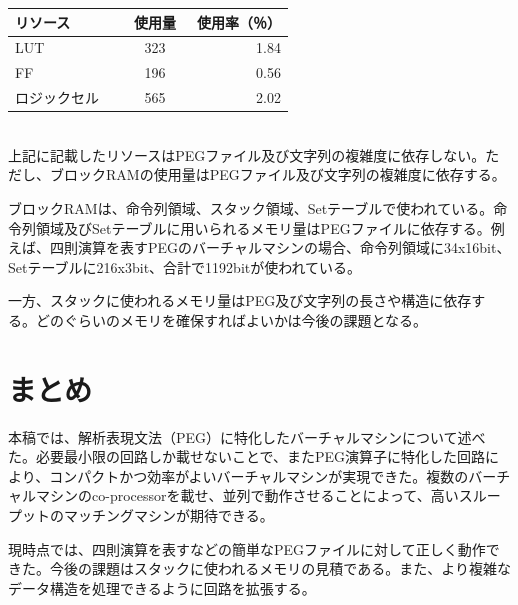 \documentclass[paper]{ieicej}
\begin{document}
\begin{tabular}[t]{lcr}
	\hline\hline
	 リソース　& 使用量　& 使用率（％） \\\hline
	 LUT & 323 & 1.84 \\
	 FF & 196 & 0.56 \\
	 ロジックセル　& 565 & 2.02 \\\hline
\end{tabular}\\
	 


上記に記載したリソースはPEGファイル及び文字列の複雑度に依存しない。ただし、ブロックRAMの使用量はPEGファイル及び文字列の複雑度に依存する。

ブロックRAMは、命令列領域、スタック領域、Setテーブルで使われている。命令列領域及びSetテーブルに用いられるメモリ量はPEGファイルに依存する。例えば、四則演算を表すPEGのバーチャルマシンの場合、命令列領域に34x16bit、Setテーブルに216x3bit、合計で1192bitが使われている。

一方、スタックに使われるメモリ量はPEG及び文字列の長さや構造に依存する。どのぐらいのメモリを確保すればよいかは今後の課題となる。






\section{まとめ}

本稿では、解析表現文法（PEG）に特化したバーチャルマシンについて述べた。必要最小限の回路しか載せないことで、またPEG演算子に特化した回路により、コンパクトかつ効率がよいバーチャルマシンが実現できた。複数のバーチャルマシンのco-processorを載せ、並列で動作させることによって、高いスループットのマッチングマシンが期待できる。

現時点では、四則演算を表すなどの簡単なPEGファイルに対して正しく動作できた。今後の課題はスタックに使われるメモリの見積である。また、より複雑なデータ構造を処理できるように回路を拡張する。

\ack %
\end{document}
